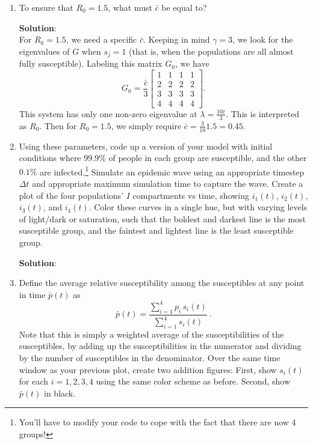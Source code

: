 \documentclass[11pt]{article}
\begin{document}
\begin{enumerate}
\begin{enumerate}[label=\alph*.]
	\item To ensure that $R_0=1.5$, what must $\bar{c}$ be equal to?
	
	\begin{tcolorbox}[breakable]
		\textbf{Solution}:\\
		For $R_0=1.5$, we need a specific $\bar{c}$. Keeping in mind $\gamma=3$, we look for the eigenvalues of $G$ when $s_j=1$ (that is, when the populations are all almost fully susceptible). Labeling this matrix $G_0$, we have
		\begin{equation*}
			G_0=\frac{\bar{c}}{3}\begin{bmatrix}
			1&1&1&1\\
			2&2&2&2\\
			3&3&3&3\\
			4&4&4&4
			\end{bmatrix}.
		\end{equation*}
		This system has only one non-zero eigenvalue at $\lambda = \frac{10 \bar{c}}{3}$. This is interpreted as $R_0$. Then for $R_0=1.5$, we simply require $\bar{c}=\frac{3}{10}1.5 = 0.45$.
	\end{tcolorbox}
	
	\item Using these parameters, code up a version of your model with initial conditions where $99.9\%$ of people in each group are susceptible, and the other $0.1\%$ are infected.\footnote{You'll have to modify your code to cope with the fact that there are now 4 groups!} Simulate an epidemic wave using an appropriate timestep $\Delta t$ and appropriate maximum simulation time to capture the wave. Create a plot of the four populations' $I$ compartments vs time, showing $i_1(t)$, $i_2(t)$, $i_3(t)$, and $i_4(t)$. Color these curves in a single hue, but with varying levels of light/dark or saturation, such that the boldest and darkest line is the most susceptible group, and the faintest and lightest line is the least susceptible group.
	
	\begin{tcolorbox}[breakable]
		\textbf{Solution}:\\
		
	\end{tcolorbox}
	
	\item Define the average relative susceptibility among the susceptibles at any point in time $\bar{p}(t)$ as
	$$\bar{p}(t) = \frac{\displaystyle \sum_{i=1}^4 p_i\,s_i(t)}{\displaystyle \sum_{i=1}^4 s_i(t)}\ .$$
	Note that this is simply a weighted average of the susceptibilities of the susceptibles, by adding up the susceptibilities in the numerator and dividing by the number of susceptibles in the denominator. Over the same time window as your previous plot, create two addition figures: First, show $s_i(t)$ for each $i=1, 2, 3, 4$ using the same color scheme as before. Second, show $\bar{p}(t)$ in black. 
	

\end{enumerate}
\end{enumerate}
\end{document}
